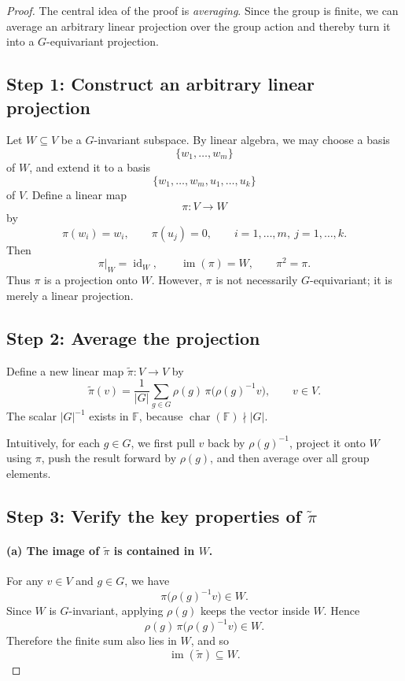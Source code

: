 \documentclass[12pt,a4paper]{ctexart}
\theoremstyle{remark}
\begin{document}
\begin{proof}
The central idea of the proof is \emph{averaging}. Since the group is finite,
we can average an arbitrary linear projection over the group action and thereby
turn it into a \(G\)-equivariant projection.

\subsection*{Step 1: Construct an arbitrary linear projection}

Let \(W \subseteq V\) be a \(G\)-invariant subspace. By linear algebra, we may
choose a basis
\[
  \{w_1,\dots,w_m\}
\]
of \(W\), and extend it to a basis
\[
  \{w_1,\dots,w_m,u_1,\dots,u_k\}
\]
of \(V\). Define a linear map
\[
  \pi: V \longrightarrow W
\]
by
\[
  \pi(w_i)=w_i,\qquad \pi(u_j)=0,
  \qquad i=1,\dots,m,\ j=1,\dots,k.
\]
Then
\[
  \pi|_W=\operatorname{id}_W,\qquad
  \operatorname{im}(\pi)=W,\qquad
  \pi^2=\pi.
\]
Thus \(\pi\) is a projection onto \(W\). However, \(\pi\) is not necessarily
\(G\)-equivariant; it is merely a linear projection.

\subsection*{Step 2: Average the projection}

Define a new linear map \(\widetilde{\pi}:V\to V\) by
\[
  \widetilde{\pi}(v)
  =
  \frac{1}{|G|}
  \sum_{g\in G}
  \rho(g)\,\pi\bigl(\rho(g)^{-1}v\bigr),
  \qquad v\in V.
\]
The scalar \(|G|^{-1}\) exists in \(\mathbb{F}\), because
\(\operatorname{char}(\mathbb{F})\nmid |G|\).

Intuitively, for each \(g\in G\), we first pull \(v\) back by
\(\rho(g)^{-1}\), project it onto \(W\) using \(\pi\), push the result forward
by \(\rho(g)\), and then average over all group elements.

\subsection*{Step 3: Verify the key properties of \(\widetilde{\pi}\)}

\paragraph{(a) The image of \(\widetilde{\pi}\) is contained in \(W\).}
For any \(v\in V\) and \(g\in G\), we have
\[
  \pi\bigl(\rho(g)^{-1}v\bigr)\in W.
\]
Since \(W\) is \(G\)-invariant, applying \(\rho(g)\) keeps the vector inside
\(W\). Hence
\[
  \rho(g)\,\pi\bigl(\rho(g)^{-1}v\bigr)\in W.
\]
Therefore the finite sum also lies in \(W\), and so
\[
  \operatorname{im}(\widetilde{\pi})\subseteq W.
\]


\end{proof}
\end{document}
